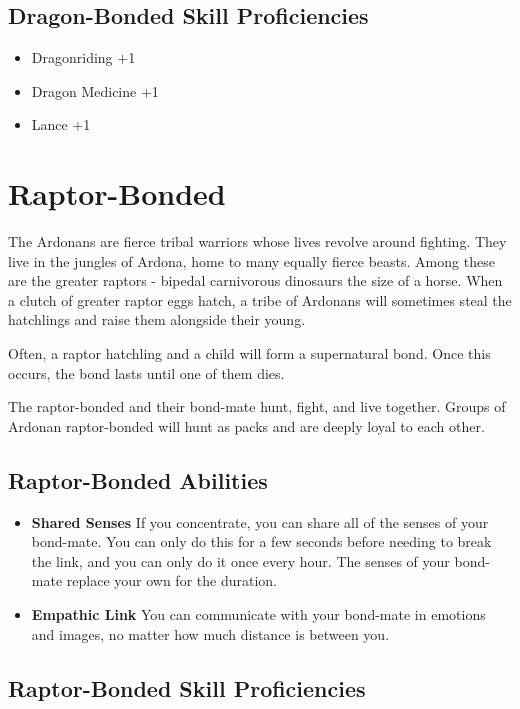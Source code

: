 \begin{multicols}{2}
\subsection{Dragon-Bonded Skill Proficiencies}

\begin{itemize}
    \item Dragonriding +1
    \item Dragon Medicine +1
    \item Lance +1
\end{itemize}

\section{Raptor-Bonded}

The Ardonans are fierce tribal warriors whose lives revolve around 
fighting. They live in the jungles of Ardona, home to many equally 
fierce beasts. Among these are the greater raptors - bipedal carnivorous 
dinosaurs the size of a horse. When a clutch of greater raptor eggs hatch, 
a tribe of Ardonans will sometimes steal the hatchlings and raise them 
alongside their young.

Often, a raptor hatchling and a child will form a supernatural bond. 
Once this occurs, the bond lasts until one of them dies.

The raptor-bonded and their bond-mate hunt, fight, and live together. 
Groups of Ardonan raptor-bonded will hunt as packs and are deeply loyal 
to each other.

\subsection{Raptor-Bonded Abilities}

\begin{itemize}
    \item \textbf{Shared Senses} If you concentrate, you can share all 
    of the senses of your bond-mate. You can only do this for a few seconds
    before needing to break the link, and you can only do it once every hour. 
    The senses of your bond-mate replace your own for the duration.
    \item \textbf{Empathic Link} You can communicate with your bond-mate 
    in emotions and images, no matter how much distance is between you.
\end{itemize}

\subsection{Raptor-Bonded Skill Proficiencies}


\end{multicols}
